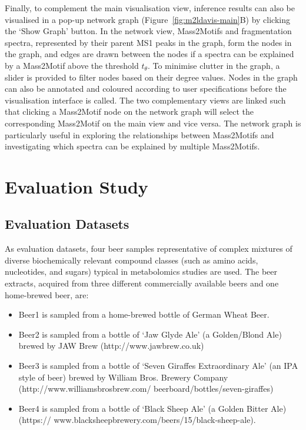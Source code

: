 Finally, to complement the main visualisation view, inference results can also be visualised in a pop-up network graph (Figure~\ref{fig:m2ldavis-main}B) by clicking the ‘Show Graph’ button. In the network view, Mass2Motifs and fragmentation spectra, represented by their parent MS1 peaks in the graph, form the nodes in the graph, and edges are drawn between the nodes if a spectra can be explained by a Mass2Motif above the threshold $t_{\theta}$. To minimise clutter in the graph, a slider is provided to filter nodes based on their degree values. Nodes in the graph can also be annotated and coloured according to user specifications before the visualisation interface is called. The two complementary views are linked such that clicking a Mass2Motif node on the network graph will select the corresponding Mass2Motif on the main view and vice versa. The network graph is particularly useful in exploring the relationships between Mass2Motifs and investigating which spectra can be explained by multiple Mass2Motifs.

\section{Evaluation Study}

\subsection{Evaluation Datasets\label{sub:ms2lda-datasets}}

As evaluation datasets, four beer samples representative of complex mixtures of diverse biochemically relevant compound classes (such as amino acids, nucleotides, and sugars) typical in metabolomics studies are used. The beer extracts, acquired from three different commercially available beers and one home-brewed beer, are:
\begin{itemize}
\item Beer1 is sampled from a home-brewed bottle of German Wheat Beer.
\item Beer2 is sampled from a bottle of ‘Jaw Glyde Ale’ (a Golden/Blond Ale) brewed by JAW Brew (http://www.jawbrew.co.uk)
\item Beer3 is sampled from a bottle of ‘Seven Giraffes Extraordinary Ale’ (an IPA style of beer) brewed by William Bros. Brewery Company (http://www.williamsbrosbrew.com/ beerboard/bottles/seven-giraffes)
\item Beer4 is sampled from a bottle of ‘Black Sheep Ale’ (a Golden Bitter Ale)  (https:// www.blacksheepbrewery.com/beers/15/black-sheep-ale).
\end{itemize}

